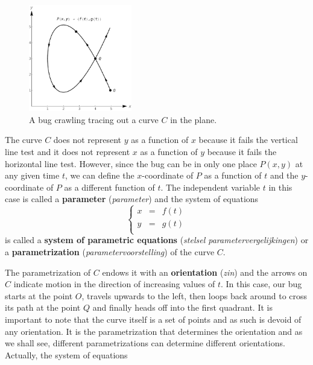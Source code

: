 \begin{figure}
	\begin{center}
			\includegraphics[width=0.4\textwidth]{fig_parametric_13}
	\caption{A bug crawling tracing out a curve $C$ in the plane. }
	\label{fig_parametric_13}
	\end{center}
\end{figure}


The curve $C$ does not represent $y$ as a function of $x$ because it fails the vertical line test and it does not represent $x$ as a function of $y$ because it fails the horizontal line test.  However, since the bug can be in only one place $P(x,y)$ at any given time $t$, we can define the $x$-coordinate of $P$ as a function of $t$ and the $y$-coordinate of $P$ as a different function of $t$.  The independent variable $t$ in this case is called a \textbf{parameter} (\textit{parameter}) and the system of equations 
\[ \left\{\begin{array}{rcl} x & = & f(t) \\ y & = & g(t) \\ \end{array} \right. \] 
is called a \textbf{system of parametric equations} (\textit{stelsel parametervergelijkingen}) or a \textbf{parametrization} (\textit{parametervoorstelling}) of the curve $C$.

  The parametrization of $C$ endows it with an  \textbf{orientation} (\textit{zin}) and the arrows on $C$ indicate motion in the direction of increasing values of $t$. In this case, our bug starts at the point $O$, travels upwards to the left, then loops back around to cross its path at the point $Q$ and finally heads off into the first quadrant.   It is important to note that the curve itself is a set of points and as such is devoid of any orientation.  It is the parametrization that determines the orientation and as we shall see, different parametrizations can determine different orientations. Actually, the system of equations 
	

